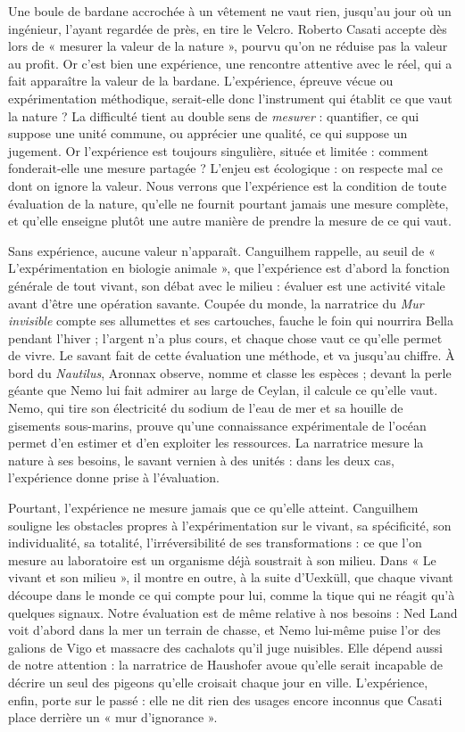 \documentclass[11pt,a4paper]{article}
\begin{document}
Une boule de bardane accrochée à un vêtement ne vaut rien, jusqu'au jour où un ingénieur, l'ayant regardée de près, en tire le Velcro. Roberto Casati accepte dès lors de « mesurer la valeur de la nature », pourvu qu'on ne réduise pas la valeur au profit. Or c'est bien une expérience, une rencontre attentive avec le réel, qui a fait apparaître la valeur de la bardane. L'expérience, épreuve vécue ou expérimentation méthodique, serait-elle donc l'instrument qui établit ce que vaut la nature ? La difficulté tient au double sens de \emph{mesurer} : quantifier, ce qui suppose une unité commune, ou apprécier une qualité, ce qui suppose un jugement. Or l'expérience est toujours singulière, située et limitée : comment fonderait-elle une mesure partagée ? L'enjeu est écologique : on respecte mal ce dont on ignore la valeur. Nous verrons que l'expérience est la condition de toute évaluation de la nature, qu'elle ne fournit pourtant jamais une mesure complète, et qu'elle enseigne plutôt une autre manière de prendre la mesure de ce qui vaut.

Sans expérience, aucune valeur n'apparaît. Canguilhem rappelle, au seuil de « L'expérimentation en biologie animale », que l'expérience est d'abord la fonction générale de tout vivant, son débat avec le milieu : évaluer est une activité vitale avant d'être une opération savante. Coupée du monde, la narratrice du \emph{Mur invisible} compte ses allumettes et ses cartouches, fauche le foin qui nourrira Bella pendant l'hiver ; l'argent n'a plus cours, et chaque chose vaut ce qu'elle permet de vivre. Le savant fait de cette évaluation une méthode, et va jusqu'au chiffre. À bord du \emph{Nautilus}, Aronnax observe, nomme et classe les espèces ; devant la perle géante que Nemo lui fait admirer au large de Ceylan, il calcule ce qu'elle vaut. Nemo, qui tire son électricité du sodium de l'eau de mer et sa houille de gisements sous-marins, prouve qu'une connaissance expérimentale de l'océan permet d'en estimer et d'en exploiter les ressources. La narratrice mesure la nature à ses besoins, le savant vernien à des unités : dans les deux cas, l'expérience donne prise à l'évaluation.

Pourtant, l'expérience ne mesure jamais que ce qu'elle atteint. Canguilhem souligne les obstacles propres à l'expérimentation sur le vivant, sa spécificité, son individualité, sa totalité, l'irréversibilité de ses transformations : ce que l'on mesure au laboratoire est un organisme déjà soustrait à son milieu. Dans « Le vivant et son milieu », il montre en outre, à la suite d'Uexküll, que chaque vivant découpe dans le monde ce qui compte pour lui, comme la tique qui ne réagit qu'à quelques signaux. Notre évaluation est de même relative à nos besoins : Ned Land voit d'abord dans la mer un terrain de chasse, et Nemo lui-même puise l'or des galions de Vigo et massacre des cachalots qu'il juge nuisibles. Elle dépend aussi de notre attention : la narratrice de Haushofer avoue qu'elle serait incapable de décrire un seul des pigeons qu'elle croisait chaque jour en ville. L'expérience, enfin, porte sur le passé : elle ne dit rien des usages encore inconnus que Casati place derrière un « mur d'ignorance ».
\end{document}
